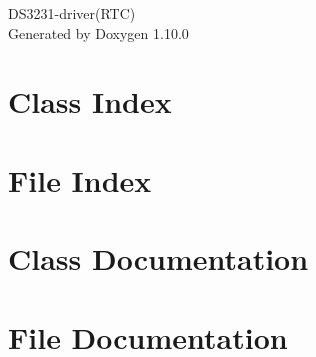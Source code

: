 \documentclass[twoside]{book}
\newcommand{\+}{\discretionary{\mbox{\scriptsize$\hookleftarrow$}}{}{}}
\newcommand{\clearemptydoublepage}{%
    \newpage{\pagestyle{empty}\cleardoublepage}%
  }
\begin{document}
  \raggedbottom
    \hypersetup{pageanchor=false,
                bookmarksnumbered=true,
                pdfencoding=unicode
               }
  \begin{titlepage}
  \vspace*{7cm}
  \begin{center}%
  {\Large DS3231-\/driver(\+RTC)}\\
  \vspace*{1cm}
  {\large Generated by Doxygen 1.10.0}\\
  \end{center}
  \end{titlepage}
  \clearemptydoublepage
  \tableofcontents
  \clearemptydoublepage
  \hypersetup{pageanchor=true}
\chapter{Class Index}

\chapter{File Index}

\chapter{Class Documentation}

\chapter{File Documentation}

  \backmatter
  \newpage
  \clearemptydoublepage
  \printindex
\end{document}
